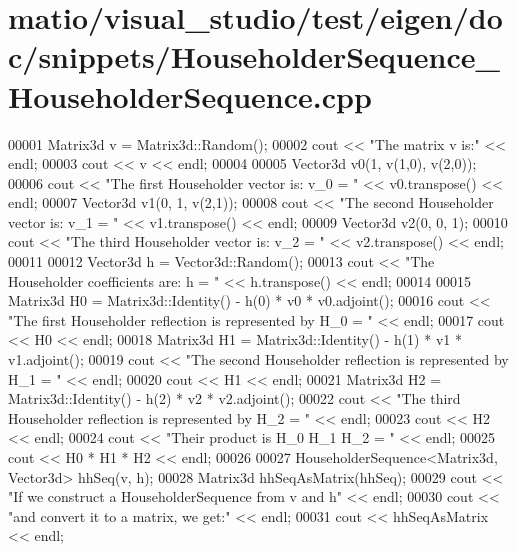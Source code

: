 \hypertarget{matio_2visual__studio_2test_2eigen_2doc_2snippets_2_householder_sequence___householder_sequence_8cpp_source}{}\section{matio/visual\+\_\+studio/test/eigen/doc/snippets/\+Householder\+Sequence\+\_\+\+Householder\+Sequence.cpp}
\label{matio_2visual__studio_2test_2eigen_2doc_2snippets_2_householder_sequence___householder_sequence_8cpp_source}

\begin{DoxyCode}
00001 Matrix3d v = Matrix3d::Random();
00002 cout << \textcolor{stringliteral}{"The matrix v is:"} << endl;
00003 cout << v << endl;
00004 
00005 Vector3d v0(1, v(1,0), v(2,0));
00006 cout << \textcolor{stringliteral}{"The first Householder vector is: v\_0 = "} << v0.transpose() << endl;
00007 Vector3d v1(0, 1, v(2,1));
00008 cout << \textcolor{stringliteral}{"The second Householder vector is: v\_1 = "} << v1.transpose()  << endl;
00009 Vector3d v2(0, 0, 1);
00010 cout << \textcolor{stringliteral}{"The third Householder vector is: v\_2 = "} << v2.transpose() << endl;
00011 
00012 Vector3d h = Vector3d::Random();
00013 cout << \textcolor{stringliteral}{"The Householder coefficients are: h = "} << h.transpose() << endl;
00014 
00015 Matrix3d H0 = Matrix3d::Identity() - h(0) * v0 * v0.adjoint();
00016 cout << \textcolor{stringliteral}{"The first Householder reflection is represented by H\_0 = "} << endl;
00017 cout << H0 << endl;
00018 Matrix3d H1 = Matrix3d::Identity() - h(1) * v1 * v1.adjoint();
00019 cout << \textcolor{stringliteral}{"The second Householder reflection is represented by H\_1 = "} << endl;
00020 cout << H1 << endl;
00021 Matrix3d H2 = Matrix3d::Identity() - h(2) * v2 * v2.adjoint();
00022 cout << \textcolor{stringliteral}{"The third Householder reflection is represented by H\_2 = "} << endl;
00023 cout << H2 << endl;
00024 cout << \textcolor{stringliteral}{"Their product is H\_0 H\_1 H\_2 = "} << endl;
00025 cout << H0 * H1 * H2 << endl;
00026 
00027 HouseholderSequence<Matrix3d, Vector3d> hhSeq(v, h);
00028 Matrix3d hhSeqAsMatrix(hhSeq);
00029 cout << \textcolor{stringliteral}{"If we construct a HouseholderSequence from v and h"} << endl;
00030 cout << \textcolor{stringliteral}{"and convert it to a matrix, we get:"} << endl;
00031 cout << hhSeqAsMatrix << endl;
\end{DoxyCode}
